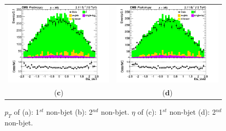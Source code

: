 \documentclass{cmspaper}
\begin{document}
\begin{figure}[htp]
\begin{tabular}{cc}
\includegraphics[scale=0.40]{results/Eta_lJet1.png}
& \hspace{-0.5cm} \includegraphics[scale=0.40]{results/Eta_lJet2.png}\\
   ($\mathbf{c}$)\qquad\qquad&($\mathbf{d}$)\qquad\qquad\qquad\\
\end{tabular}
\caption{$p_{T}$ of (a): 1$^{st}$ non-bjet (b): 2$^{nd}$ non-bjet. $\eta$ of (c): 1$^{st}$ non-bjet (d): 2$^{nd}$ non-bjet.}\label{Pts_etas_ljets}
\end{figure}
\end{document}
